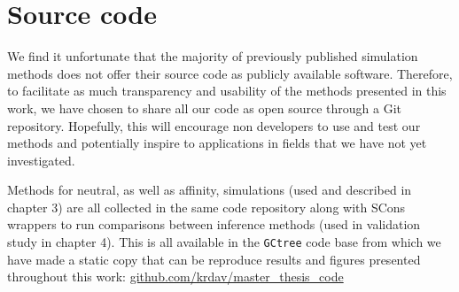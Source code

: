 \chapter{Source code}
We find it unfortunate that the majority of previously published simulation methods does not offer their source code as publicly available software.
Therefore, to facilitate as much transparency and usability of the methods presented in this work, we have chosen to share all our code as open source through a Git repository.
Hopefully, this will encourage non developers to use and test our methods and potentially inspire to applications in fields that we have not yet investigated.

Methods for neutral, as well as affinity, simulations (used and described in chapter 3) are all collected in the same code repository along with SCons wrappers to run comparisons between inference methods (used in validation study in chapter 4).
This is all available in the \texttt{GCtree} code base from which we have made a static copy that can be reproduce results and figures presented throughout this work:
\url{github.com/krdav/master_thesis_code}

